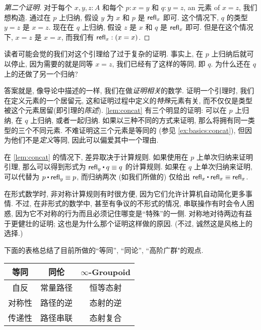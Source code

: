 \begin{proof}[第二个证明]
对于每个 $x,y,z:A$ 和每个 $p:x=y$ 和 $q:y=z$, an 元素 of $x=z$, 我们想构造.
通过在 $p$ 上归纳, 假设 $y$ 为 $x$ 和 $p$ 是 $\mathsf{refl}_{x}$ 即可.
这个情况下, $q$ 的类型 $y=z$ 是 $x=z$.
现在在 $q$ 上归纳, 假设 $z$ 是 $x$ 和 $q$ 是 $\mathsf{refl}_{x}$ 即可.
但是在这个情况下, $x=z$ 是 $x=x$, 而我们有 $\mathsf{refl}_{x}:(x=x)$.
\end{proof}

读者可能会觉的我们对这个引理给了过于复杂的证明. 事实上, 在 $p$ 上归纳后就可以停止, 因为需要的就是同等 $x=z$, 我们已经有了这样的等同, 即 $q$. 为什么还在 $q$ 上的还做了另一个归纳? 

答案就是, 像导论中描述的一样, 我们在做\emph{证明相关}的数学. %
证明一个引理时, 我们在定义元素的一个居留元, 这和证明过程中定义的\emph{特殊}元素有关, 而不仅仅是类型被这个元素居留(即引理的\emph{陈述}). \cref{lem:concat} 有三个明显的证明: 可以在 $p$ 上归纳, 在 $q$ 上归纳, 或者一起归纳.
如果以三种不同的方式来证明, 那么将拥有同一类型的三个不同元素. 不难证明这三个元素是等同的 (参见 \cref{ex:basics:concat}), 但因为他们不是\emph{定义}等同, 因此可以偏爱其中一个理由. 

在 \cref{lem:concat} 的情况下, 差异取决于计算规则. 如果使用在 $p$ 上单次归纳来证明引理, 那么可以得到形式为 $\refl{y} \ct q \jdeq q$ 的计算规则. 如果在 $q$ 上单次归纳来证明, 可以代替为 $p\ct\refl{y}\jdeq p$, 而归纳两次 (如我们所做的) 仅给出 $\refl{x}\ct\refl{x} \jdeq \refl{x}$. 

%
在形式数学时, 非对称计算规则有时很方便, 因为它们允许计算机自动简化更多事情. 不过, 在非形式的数学中, 甚至有争议的不形式的情况, 串联操作有时会令人困惑, 因为它不对称的行为而且必须记住哪变是``特殊''的一侧. 对称地对待两边有益于更健壮的证明; 这也是为什么那个证明这样做的原因. (不过, 诚然这是风格上的选择.) 

下面的表格总结了目前所做的``等同'', ``同论'', ``高阶广群"的观点. \begin{center}
\medskip
\begin{tabular}{ccc}
\toprule
等同 &同伦 &$\infty$-Groupoid\\
\midrule
自反\index{等同!的自反} &常量路径 &恒等态射\\
对称性\index{等同!对称性} &路径的逆 &态射的逆\\
传递性\index{等同!的传递性} &路径串联 &态射复合\\
\bottomrule
\end{tabular}
\medskip
\end{center}

